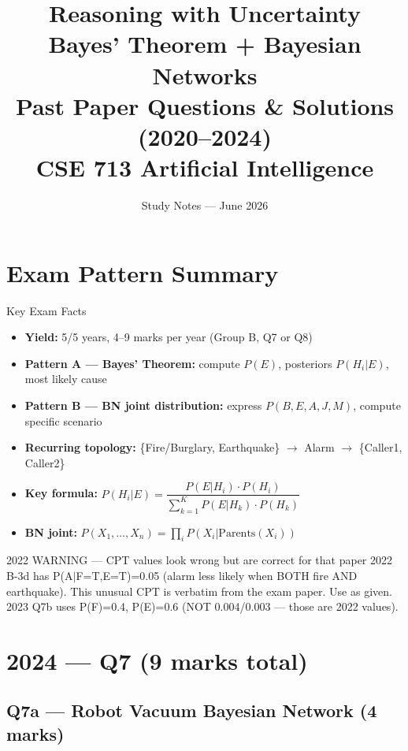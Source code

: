 \documentclass[12pt,a4paper]{article}
\title{\color{planblue}\Huge\bfseries Reasoning with Uncertainty\\[0.4em]
  \Large Bayes' Theorem + Bayesian Networks\\[0.2em]
  \normalsize Past Paper Questions \& Solutions (2020--2024)\\[0.2em]
  \normalsize CSE 713 Artificial Intelligence}
\author{Study Notes --- June 2026}
\date{}
\begin{document}
\maketitle
\tableofcontents
\newpage

\section*{Exam Pattern Summary}

\begin{keybox}{Key Exam Facts}
\begin{itemize}[noitemsep]
  \item \textbf{Yield:} 5/5 years, 4--9 marks per year (Group B, Q7 or Q8)
  \item \textbf{Pattern A --- Bayes' Theorem:} compute $P(E)$, posteriors $P(H_i|E)$, most likely cause
  \item \textbf{Pattern B --- BN joint distribution:} express $P(B,E,A,J,M)$, compute specific scenario
  \item \textbf{Recurring topology:} \{Fire/Burglary, Earthquake\} $\to$ Alarm $\to$ \{Caller1, Caller2\}
  \item \textbf{Key formula:} $P(H_i|E) = \dfrac{P(E|H_i)\cdot P(H_i)}{\sum_{k=1}^{K} P(E|H_k)\cdot P(H_k)}$
  \item \textbf{BN joint:} $P(X_1,\ldots,X_n) = \prod_i P(X_i|\text{Parents}(X_i))$
\end{itemize}
\end{keybox}

\begin{warnbox}{2022 WARNING --- CPT values look wrong but are correct for that paper}
2022 B-3d has P(A$|$F=T,E=T)=0.05 (alarm less likely when BOTH fire AND earthquake). This unusual CPT is verbatim from the exam paper. Use as given.\\
2023 Q7b uses P(F)=0.4, P(E)=0.6 (NOT 0.004/0.003 --- those are 2022 values).
\end{warnbox}

\newpage
\section{2024 --- Q7 (9 marks total)}

\subsection{Q7a --- Robot Vacuum Bayesian Network (4 marks)}
\end{document}

